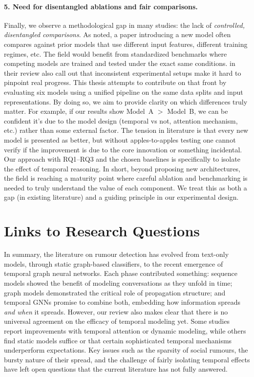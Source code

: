 \documentclass{cshonours}
\begin{document}
\paragraph{5. Need for disentangled ablations and fair comparisons.} Finally, we observe a methodological gap in many studies: the lack of \emph{controlled, disentangled comparisons}. As noted, a paper introducing a new model often compares against prior models that use different input features, different training regimes, etc. The field would benefit from standardized benchmarks where competing models are trained and tested under the exact same conditions. \cite{zhang2024graph} in their review also call out that inconsistent experimental setups make it hard to pinpoint real progress. This thesis attempts to contribute on that front by evaluating six models using a unified pipeline on the same data splits and input representations. By doing so, we aim to provide clarity on which differences truly matter. For example, if our results show Model~A $>$ Model~B, we can be confident it’s due to the model design (temporal vs not, attention mechanism, etc.) rather than some external factor. The tension in literature is that every new model is presented as better, but without apples-to-apples testing one cannot verify if the improvement is due to the core innovation or something incidental. Our approach with RQ1–RQ3 and the chosen baselines is specifically to isolate the effect of temporal reasoning. In short, beyond proposing new architectures, the field is reaching a maturity point where careful ablation and benchmarking is needed to truly understand the value of each component. We treat this as both a gap (in existing literature) and a guiding principle in our experimental design.

\section{Links to Research Questions}
In summary, the literature on rumour detection has evolved from text-only models, through static graph-based classifiers, to the recent emergence of temporal graph neural networks. Each phase contributed something: sequence models showed the benefit of modeling conversations as they unfold in time; graph models demonstrated the critical role of propagation structure; and temporal GNNs promise to combine both, embedding how information spreads \emph{and when} it spreads. However, our review also makes clear that there is no universal agreement on the efficacy of temporal modeling yet. Some studies report improvements with temporal attention or dynamic modeling, while others find static models suffice or that certain sophisticated temporal mechanisms underperform expectations. Key issues such as the sparsity of social rumours, the bursty nature of their spread, and the challenge of fairly isolating temporal effects have left open questions that the current literature has not fully answered.
\end{document}
